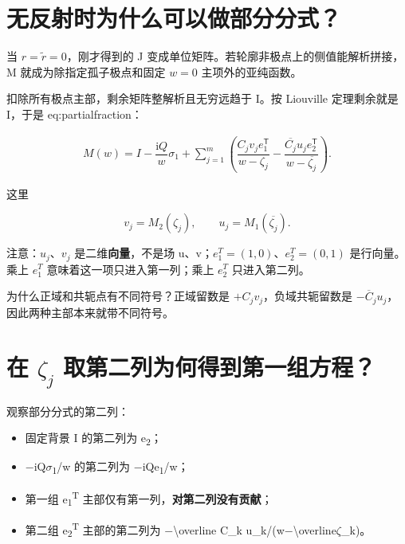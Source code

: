 \section{无反射时为什么可以做部分分式？}
\par

当 $r=\widetilde r=0$，刚才得到的 J 变成单位矩阵。若轮廓非极点上的侧值能解析拼接，M 就成为除指定孤子极点和固定 $w=0$ 主项外的亚纯函数。\par

扣除所有极点主部，剩余矩阵整解析且无穷远趋于 I。按 Liouville 定理剩余就是 I，于是 eq:partialfraction：\par

\[
\boxed{
\begin{aligned}
M(w)=I-\dfrac{\mathrm{i}Q}{w}\sigma_1
+\sum\limits_{j=1}^{m}\left(
\dfrac{C_jv_je_1^{\mathsf T}}{w-\zeta_j}
-\dfrac{\overline{C_j}u_je_2^{\mathsf T}}{w-\overline{\zeta_j}}
\right).
\end{aligned}}
\]

这里\par

\[
v_j=M_2(\zeta_j),\qquad
u_j=M_1(\overline{\zeta_j}).
\]

注意：$u_j$、$v_j$ 是二维\textbf{向量}，不是场 u、v；$e_{1}^{T}=(1,0)$、$e_{2}^{T}=(0,1)$ 是行向量。乘上 $e_{1}^{T}$ 意味着这一项只进入第一列；乘上 $e_{2}^{T}$ 只进入第二列。\par

为什么正域和共轭点有不同符号？正域留数是 $+C_{j}v_{j}$，负域共轭留数是 $-\overline C_{j}u_{j}$，因此两种主部本来就带不同符号。\par

\section{在 \texorpdfstring{$\zeta_j$}{zetaj} 取第二列为何得到第一组方程？}
\par

观察部分分式的第二列：\par

\begin{itemize}[leftmargin=2em]
\item 固定背景 I 的第二列为 e\textsubscript{2}；
\item \ensuremath{-}iQ\ensuremath{\sigma}\textsubscript{1}/w 的第二列为 \ensuremath{-}iQe\textsubscript{1}/w；
\item 第一组 e\textsubscript{1}\textsuperscript{T} 主部仅有第一列，\textbf{对第二列没有贡献}；
\item 第二组 e\textsubscript{2}\textsuperscript{T} 主部的第二列为 \ensuremath{-}\textbackslash{}overline C\_k u\_k/(w\ensuremath{-}\textbackslash{}overline\ensuremath{\zeta}\_k)。
\end{itemize}

